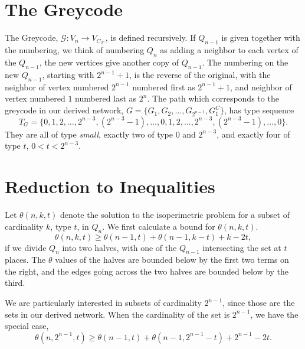 \documentclass[12pt]{ucthesis}
\theoremstyle{plain}
\theoremstyle{definition}
\begin{document}
\section{The Greycode}
\label{Section 2.6}

The Greycode, $\mathcal{G} \colon V_n \rightarrow V_{C_{2^n}}$,
is defined recursively.
If $Q_{n - 1}$ is given together with the numbering,
we think of numbering $Q_n$ as adding a neighbor to each vertex of the $Q_{n - 1}$,
the new vertices give another copy of $Q_{n - 1}$.
The numbering on the new $Q_{n - 1}$, starting with $2^{n - 1} + 1$,
is the reverse of the original,
with the neighbor of vertex numbered $2^{n - 1}$ numbered first as $2^{n - 1} + 1$,
and neighbor of vertex numbered $1$ numbered last as $2^n$.
The path which corresponds to the greycode in our derived network,
$G = \{G_1, G_2, \dots, G_{2^{n - 1}}, G_1^C\}$, has type sequence
\begin{equation*}
T_G = \{0, 1, 2, \dots, 2^{n - 3}, (2^{n - 3} - 1), \dots, 0, 1, 2, \dots, 2^{n - 3}, (2^{n - 3} - 1), \dots, 0\}.
\end{equation*}
They are all of type \emph{small}, exactly two of type $0$ and $2^{n - 3}$,
and exactly four of type $t$, $0 < t < 2^{n - 3}$.

\section{Reduction to Inequalities}
\label{Section 2.7}

Let $\theta(n, k, t)$ denote the solution to the isoperimetric problem
for a subset of cardinality $k$, type $t$, in $Q_n$.
We first calculate a bound for $\theta(n, k, t)$.
\begin{equation}
\label{Equation 2.1}
\theta(n, k, t) \ge \theta(n - 1, t) + \theta(n - 1, k - t) + k - 2 t,
\end{equation}
if we divide $Q_n$ into two halves,
with one of the $Q_{n - 1}$ intersecting the set at $t$ places.
The $\theta$ values of the halves are bounded below by the first two terms on the right,
and the edges going across the two halves are bounded below by the third.

We are particularly interested in subsets of cardinality $2^{n - 1}$,
since those are the sets in our derived network.
When the cardinality of the set is $2^{n - 1}$, we have the special case,
\begin{equation}
\label{Equation 2.2}
\theta(n, 2^{n - 1}, t) \ge \theta(n - 1, t) + \theta(n - 1, 2^{n - 1} - t) + 2^{n - 1} - 2 t.
\end{equation}
\end{document}
